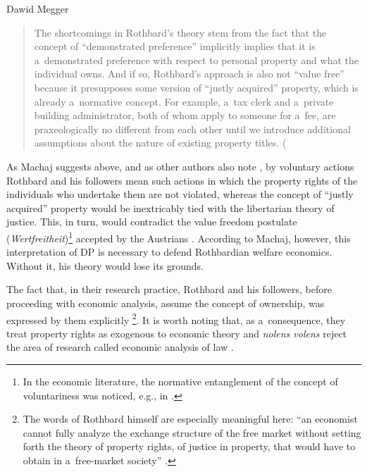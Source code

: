 \begin{artengenv}{Dawid Megger}
\begin{quote}
The shortcomings in Rothbard's theory stem from the fact that the concept of ``demonstrated preference'' implicitly implies that it is a~demonstrated preference with respect to personal property and what the individual owns. And if so, Rothbard's approach is also not ``value free'' because it presupposes some version of ``justly acquired'' property, which is already a~normative concept. For example, a~tax clerk and a~private building administrator, both of whom apply to someone for a~fee, are praxeologically no different from each other until we introduce additional assumptions about the nature of existing property titles. (
\parencite[][own transl.]{machaj_murray_2014}%
\end{quote}




As Machaj suggests above, and as other authors also note 
\parencite[e.g.,][]{cordato_welfare_1992}, %
 by voluntary actions Rothbard and his followers mean such actions in which the property rights of the individuals who undertake them are not violated, whereas the concept of ``justly acquired'' property would be inextricably tied with the libertarian theory of justice. This, in turn, would contradict the value freedom postulate (\textit{Wertfreitheit})\footnote{In the economic literature, the normative entanglement of the concept of voluntariness was noticed, e.g., in 
\parencites[][]{high_is_1985}[][]{hausman_economic_2006}.%
} accepted by the Austrians 
\parencites[e.g.,][]{mises_human_1998}[][]{rothbard_praxeology_2011}[][]{kirzner_value-freedom_1994}[][]{block_value_2005}. %
 According to Machaj, however, this interpretation of DP is necessary to defend Rothbardian welfare economics. Without it, his theory would lose its grounds.



The fact that, in their research practice, Rothbard and his followers, before proceeding with economic analysis, assume the concept of ownership, was expressed by them explicitly \footnote{The words of Rothbard himself are especially meaningful here: ``an economist cannot fully analyze the exchange structure of the free market without setting forth the theory of property rights, of justice in property, that would have to obtain in a~free-market society'' 
\parencites[][]{block_ethics_1995}[][]{block_private-property_2000}[][]{hulsmann_priori_2004}[][p.1047]{rothbard_power_2009}[][]{rothbard_man_2009}.%
}. It is worth noting that, as a~consequence, they treat property rights as exogenous to economic theory and \textit{nolens volens} reject the area of research called economic analysis of law 
\parencite[see:][]{machaj_murray_2014}.%





\end{artengenv}
